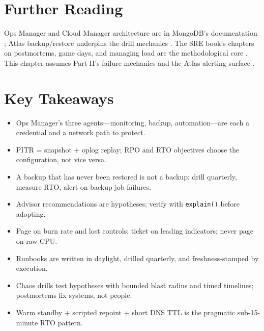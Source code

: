\section{Further Reading}
Ops Manager and Cloud Manager architecture are in MongoDB's documentation \cite{mongodbOpsManagerDocs}; Atlas backup/restore underpins the drill mechanics \cite{mongodbAtlasBackupDocs}. The SRE book's chapters on postmortems, game days, and managing load are the methodological core \cite{sreBook}. This chapter assumes Part II's failure mechanics \cite{mongodbReplicationDocs,mongodbShardingDocs} and the Atlas alerting surface \cite{mongodbAtlasMonitoringDocs}.

\section*{Key Takeaways}
\begin{itemize}
    \item Ops Manager's three agents---monitoring, backup, automation---are each a credential and a network path to protect.
    \item PITR = snapshot + oplog replay; RPO and RTO objectives choose the configuration, not vice versa.
    \item A backup that has never been restored is not a backup: drill quarterly, measure RTO, alert on backup job failures.
    \item Advisor recommendations are hypotheses; verify with \texttt{explain()} before adopting.
    \item Page on burn rate and lost controls; ticket on leading indicators; never page on raw CPU.
    \item Runbooks are written in daylight, drilled quarterly, and freshness-stamped by execution.
    \item Chaos drills test hypotheses with bounded blast radius and timed timelines; postmortems fix systems, not people.
    \item Warm standby + scripted repoint + short DNS TTL is the pragmatic sub-15-minute RTO pattern.
\end{itemize}

